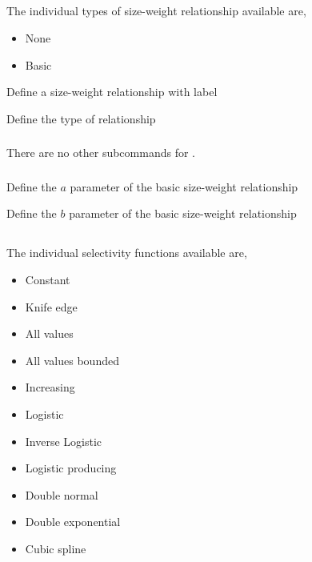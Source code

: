 \subsection{}

The individual types of size-weight relationship available are,

\begin{itemize}
	\item None
	\item Basic
\end{itemize}

 {Define a size-weight relationship with label}

 {Define the type of relationship}

\subsubsection[None]{}

There are no other subcommands for .

\subsubsection[Basic]{}

 {Define the $a$ parameter of the basic size-weight relationship}

 {Define the $b$ parameter of the basic size-weight relationship}

\subsection{}

The individual selectivity functions available are,

\begin{itemize}
	\item Constant
	\item Knife edge
	\item All values
	\item All values bounded
	\item Increasing
	\item Logistic
	\item Inverse Logistic
	\item Logistic producing
	\item Double normal
	\item Double exponential
	\item Cubic spline
\end{itemize}

